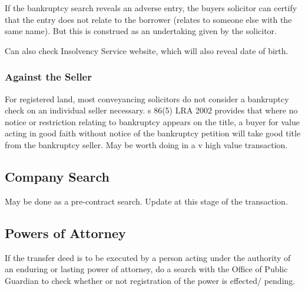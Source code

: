 \documentclass[
]{article}
\newenvironment{Shaded}{}{}
\newcommand{\NormalTok}[1]{#1}
\begin{document}
\begin{Shaded}
\begin{Highlighting}[]
\NormalTok{If the bankruptcy search reveals an adverse entry, the buyer\textquotesingle{}s solicitor can certify that the entry does not relate to the borrower (relates to someone else with the same name). But this is construed as an undertaking given by the solicitor. }
\end{Highlighting}
\end{Shaded}

Can also check Insolvency Service website, which will also reveal date
of birth.

\hypertarget{against-the-seller}{%
\subsubsection{Against the Seller}\label{against-the-seller}}

For registered land, most conveyancing solicitors do not consider a
bankruptcy check on an individual seller necessary. s 86(5) LRA 2002
provides that where no notice or restriction relating to bankruptcy
appears on the title, a buyer for value acting in good faith without
notice of the bankruptcy petition will take good title from the
bankruptcy seller. May be worth doing in a v high value transaction.

\hypertarget{company-search}{%
\subsection{Company Search}\label{company-search}}

May be done as a pre-contract search. Update at this stage of the
transaction.

\hypertarget{powers-of-attorney}{%
\subsection{Powers of Attorney}\label{powers-of-attorney}}

If the transfer deed is to be executed by a person acting under the
authority of an enduring or lasting power of attorney, do a search with
the Office of Public Guardian to check whether or not registration of
the power is effected/ pending.
\end{document}
